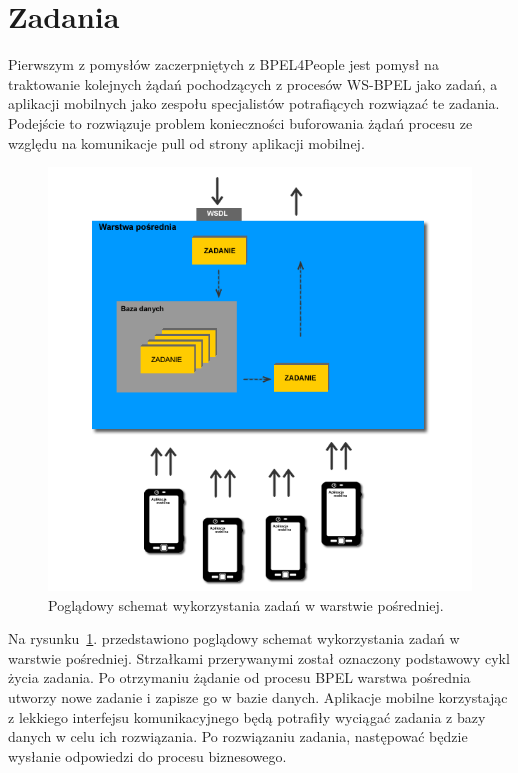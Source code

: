 
\section{Zadania}
\label{sec:tasks}

Pierwszym z pomysłów zaczerpniętych z BPEL4People jest pomysł na traktowanie kolejnych żądań pochodzących z procesów WS-BPEL jako zadań, a aplikacji mobilnych jako zespołu specjalistów potrafiących rozwiązać te zadania. Podejście to rozwiązuje problem konieczności buforowania żądań procesu ze względu na komunikacje pull od strony aplikacji mobilnej. 

\begin{figure}[h]
\centerline{\includegraphics[scale=0.5]{middlewareTasksConceptDiagram}}
\caption{Poglądowy schemat wykorzystania zadań w warstwie pośredniej.}
\label{fig:middlewareTasksConceptDiagram}
\end{figure}

Na rysunku~\ref{fig:middlewareTasksConceptDiagram}. przedstawiono poglądowy schemat wykorzystania zadań w warstwie pośredniej. Strzałkami przerywanymi został oznaczony podstawowy cykl życia zadania. Po otrzymaniu żądanie od procesu BPEL warstwa pośrednia utworzy nowe zadanie i zapisze go w bazie danych. Aplikacje mobilne korzystając z lekkiego interfejsu komunikacyjnego będą potrafiły wyciągać zadania z bazy danych w celu ich rozwiązania. Po rozwiązaniu zadania, następować będzie wysłanie odpowiedzi do procesu biznesowego. 

